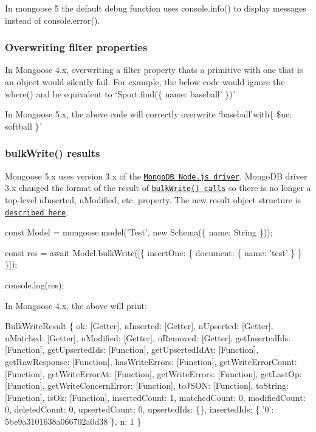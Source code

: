 In mongoose 5 the default debug function uses {\ttfamily console.\+info()} to display messages instead of {\ttfamily console.\+error()}.

\subsubsection*{Overwriting filter properties}

In Mongoose 4.\+x, overwriting a filter property that\textquotesingle{}s a primitive with one that is an object would silently fail. For example, the below code would ignore the {\ttfamily where()} and be equivalent to `Sport.\+find(\{ name\+: \textquotesingle{}baseball' \})\`{}




In Mongoose 5.\+x, the above code will correctly overwrite `\textquotesingle{}baseball'{\ttfamily with}\{ \$ne\+: \textquotesingle{}softball\textquotesingle{} \}\`{}

\subsubsection*{{\ttfamily bulk\+Write()} results}

Mongoose 5.\+x uses version 3.\+x of the \href{http://npmjs.com/package/mongodb}{\tt Mongo\+DB Node.\+js driver}. Mongo\+DB driver 3.\+x changed the format of the result of \href{http://localhost:8088/docs/api.html#model_Model.bulkWrite}{\tt {\ttfamily bulk\+Write()} calls} so there is no longer a top-\/level {\ttfamily n\+Inserted}, {\ttfamily n\+Modified}, etc. property. The new result object structure is \href{http://mongodb.github.io/node-mongodb-native/3.1/api/Collection.html#~BulkWriteOpResult}{\tt described here}.


\begin{DoxyCode}
const Model = mongoose.model('Test', new Schema(\{ name: String \}));

const res = await Model.bulkWrite([\{ insertOne: \{ document: \{ name: 'test' \} \} \}]);

console.log(res);
\end{DoxyCode}


In Mongoose 4.\+x, the above will print\+:


\begin{DoxyCode}
BulkWriteResult \{
  ok: [Getter],
  nInserted: [Getter],
  nUpserted: [Getter],
  nMatched: [Getter],
  nModified: [Getter],
  nRemoved: [Getter],
  getInsertedIds: [Function],
  getUpsertedIds: [Function],
  getUpsertedIdAt: [Function],
  getRawResponse: [Function],
  hasWriteErrors: [Function],
  getWriteErrorCount: [Function],
  getWriteErrorAt: [Function],
  getWriteErrors: [Function],
  getLastOp: [Function],
  getWriteConcernError: [Function],
  toJSON: [Function],
  toString: [Function],
  isOk: [Function],
  insertedCount: 1,
  matchedCount: 0,
  modifiedCount: 0,
  deletedCount: 0,
  upsertedCount: 0,
  upsertedIds: \{\},
  insertedIds: \{ '0': 5be9a3101638a066702a0d38 \},
  n: 1 \}
\end{DoxyCode}


